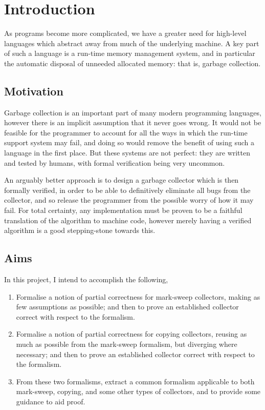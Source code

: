 \chapter{Introduction}
\label{sec:intro}

As programs become more complicated, we have a greater need for
high-level languages which abstract away from much of the underlying
machine. A key part of such a language is a run-time memory management
system, and in particular the automatic disposal of unneeded allocated
memory: that is, garbage collection.

\section{Motivation}
\label{sec:intro-motivation}

Garbage collection is an important part of many modern programming
languages, however there is an implicit assumption that it never goes
wrong. It would not be feasible for the programmer to account for all
the ways in which the run-time support system may fail, and doing so
would remove the benefit of using such a language in the first
place. But these systems are not perfect: they are written and tested
by humans, with formal verification being very uncommon.

An arguably better approach is to design a garbage collector which is
then formally verified, in order to be able to definitively eliminate
all bugs from the collector, and so release the programmer from the
possible worry of how it may fail. For total certainty, any
implementation must be proven to be a faithful translation of the
algorithm to machine code, however merely having a verified algorithm
is a good stepping-stone towards this.

\section{Aims}
\label{sec:intro-goals}

In this project, I intend to accomplish the following,

\begin{enumerate}
  \item Formalise a notion of partial correctness for mark-sweep
    collectors, making as few assumptions as possible; and then to prove
    an established collector correct with respect to the formalism.

  \item Formalise a notion of partial correctness for copying
    collectors, reusing as much as possible from the mark-sweep
    formalism, but diverging where necessary; and then to prove an
    established collector correct with respect to the formalism.

  \item From these two formalisms, extract a common formalism
    applicable to both mark-sweep, copying, and some other types of
    collectors, and to provide some guidance to aid proof.
\end{enumerate}

